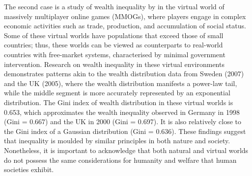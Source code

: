 \documentclass[12pt]{article}
\begin{document}
The second case is a study of wealth inequality by \textcite{fuchs2014behavioral} in the virtual world of massively multiplayer online games (MMOGs), where players engage in complex economic activities such as trade, production, and accumulation of social status. Some of these virtual worlds have populations that exceed those of small countries; thus, these worlds can be viewed as counterparts to real-world countries with free-market systems, characterised by minimal government intervention. Research on wealth inequality in these virtual environments demonstrates patterns akin to the wealth distribution data from Sweden (2007) and the UK (2005), where the wealth distribution manifests a power-law tail, while the middle segment is more accurately represented by an exponential distribution. The Gini index of wealth distribution in these virtual worlds is 0.653, which approximates the wealth inequality observed in Germany in 1998 (Gini = 0.667) and the UK in 2000 (Gini = 0.697). It is also relatively close to the Gini index of a Gaussian distribution (Gini = 0.636). These findings suggest that inequality is moulded by similar principles in both nature and society. Nonetheless, it is important to acknowledge that both natural and virtual worlds do not possess the same considerations for humanity and welfare that human societies exhibit.
\end{document}
